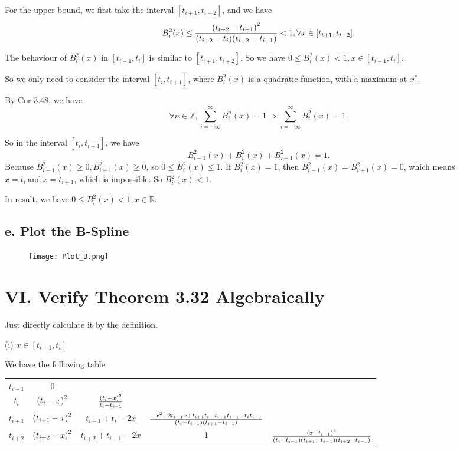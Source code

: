 \documentclass[a4paper]{article}
\begin{document}
For the upper bound, we first take the interval $[t_{i+1}, t_{i+2}]$, and we have
\begin{equation}
    B_i^2(x) \leq \frac{\qty(t_{i+2} - t_{i+1})^2}{\qty(t_{i+2} - t_{i}) \qty(t_{i+2} - t_{i+1})} < 1, \forall x \in [t_{i+1}, t_{i+2}].
\end{equation}

The behaviour of $B_i^2(x)$ in $[t_{i-1}, t_i]$ is similar to $[t_{i+1}, t_{i+2}]$. So we have $ 0 \leq B_i^2(x) < 1, x \in [t_{i-1}, t_{i}]$. 

So we only need to consider the interval $[t_i, t_{i+1}]$, where $B_i^2(x)$ is a quadratic function, with a maximum at $x^*$. 

By Cor 3.48, we have 
\begin{equation}
    \forall n \in \mathbb{Z}, \sum_{i=- \infty}^{\infty} B_i^n(x) = 1 \Rightarrow \sum_{i=-\infty}^{\infty} B_i^2(x) = 1.
\end{equation}

So in the interval $[t_i, t_{i+1}]$, we have
\begin{equation}
    B_{i-1}^2(x) + B_i^2(x) + B_{i+1}^2(x) = 1. 
\end{equation}
Because $B_{i-1}^2(x) \geq 0, B_{i+1}^2(x) \geq 0$, so $ 0 \leq B_i^2(x) \leq 1$. If $B_i^2(x) = 1$, then $B_{i-1}^2(x) = B_{i+1}^2(x) = 0$, which means $x = t_i ~\text{and}~ x =  t_{i+1}$, which is impossible. So $B_i^2(x) < 1$.

In result, we have $0 \leq B_i^2(x) < 1, x \in \mathbb{R}$.

\subsection*{e. Plot the B-Spline}
\begin{figure}[H]
    \centering
    \texttt{[image: Plot\_B.png]}
\end{figure}


\section*{VI. Verify Theorem 3.32 Algebraically}

Just directly calculate it by the definition. 

(i) $x \in [t_{i-1}, t_{i}]$

We have the following table
\begin{table}[H]
    \centering  
    \begin{tabular}{c|cccc}
    $t_{i-1}$  & 0 &    & \\
    $t_{i}$    & $\qty(t_i - x)^2$ & $\frac{\qty(t_i - x)^2}{t_{i} - t_{i-1}}$  & \\
    $t_{i+1}$  & $\qty(t_{i+1} - x)^2$ & $t_{i+1}+t_i - 2x$  & $\frac{-x^2+2t_{i-1}x+t_{i+1}t_i - t_{i+1}t_{i-1}-t_i t_{i-1}}{\qty(t_i-t_{i-1})\qty(t_{i+1}-t_{i-1})}$& \\
    $t_{i+2}$  & $\qty(t_{i+2} - x)^2$ & $t_{i+2}+t_{i+1} - 2x$  & 1 & $\frac{\qty(x-t_{i-1})^2}{\qty(t_i - t_{i-1})\qty(t_{i+1} - t_{i-1})\qty(t_{i+2} - t_{i-1})}$\\
    \end{tabular}
\end{table} 
\end{document}
